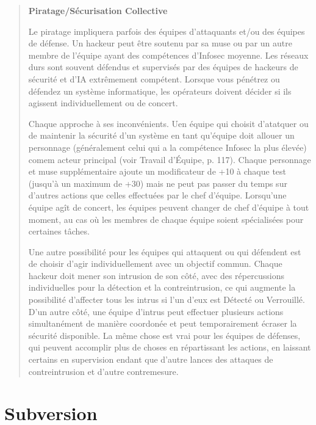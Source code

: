 \begin{quotation} \textbf{Piratage/Sécurisation Collective} 

Le piratage impliquera parfois des équipes d'attaquants et/ou des équipes de défense. Un hackeur peut être soutenu par sa muse ou par un autre membre de l'équipe ayant des compétences d'Infosec moyenne. Les réseaux durs sont souvent défendus et supervisés par des équipes de hackeurs de sécurité et d'IA extrêmement compétent. Lorsque vous pénétrez ou défendez un système informatique, les opérateurs doivent décider si ils agissent individuellement ou de concert. 

Chaque approche à ses inconvénients. Uen équipe qui choisit d'atatquer ou de maintenir la sécurité d'un système en tant qu'équipe doit allouer un personnage (généralement celui qui a la compétence Infosec la plus élevée) comem acteur principal (voir Travail d'Équipe, p. 117). Chaque personnage et muse supplémentaire ajoute un modificateur de +10 à chaque test (jusqu'à un maximum de +30) mais ne peut pas passer du temps sur d'autres actions que celles effectuées par le chef d'équipe. Lorsqu'une équipe agît de concert, les équipes peuvent changer de chef d'équipe à tout moment, au cas où les membres de chaque équipe soient spécialisées pour certaines tâches. 

Une autre possibilité pour les équipes qui attaquent ou qui défendent est de choisir d'agir individuellement avec un objectif commun. Chaque hackeur doit mener son intrusion de son côté, avec des répercussions individuelles pour la détection et la contreintrusion, ce qui augmente la possibilité d'affecter tous les intrus si l'un d'eux est Détecté ou Verrouillé. D'un autre côté, une équipe d'intrus peut effectuer plusieurs actions simultanément de manière coordonée et peut temporairement écraser la sécurité disponible. La même chose est vrai pour les équipes de défenses, qui peuvent accomplir plus de choses en répartissant les actions, en laissant certains en supervision endant que d'autre lances des attaques de contreintrusion et d'autre contremesure. \end{quotation} 



\section{Subversion} 

